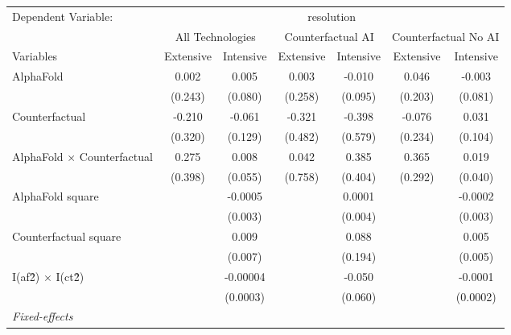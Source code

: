 \begingroup
\centering
\begin{tabular}{lcccccc}
   \tabularnewline \midrule \midrule
   Dependent Variable: & \multicolumn{6}{c}{resolution}\\
 & \multicolumn{2}{c}{All Technologies} & \multicolumn{2}{c}{Counterfactual AI} & \multicolumn{2}{c}{Counterfactual No AI} \\
\cmidrule(lr){1-1}\cmidrule(lr){2-3} \cmidrule(lr){4-5} \cmidrule(lr){6-7}
Variables & \multicolumn{1}{c}{Extensive} & \multicolumn{1}{c}{Intensive} & \multicolumn{1}{c}{Extensive} & \multicolumn{1}{c}{Intensive} & \multicolumn{1}{c}{Extensive} & \multicolumn{1}{c}{Intensive} \\
\cmidrule(lr){1-1}\cmidrule(lr){2-2} \cmidrule(lr){3-3} \cmidrule(lr){4-4} \cmidrule(lr){5-5} \cmidrule(lr){6-6} \cmidrule(lr){7-7}
   AlphaFold                          & 0.002   & 0.005    & 0.003   & -0.010  & 0.046   & -0.003\\   
                                      & (0.243) & (0.080)  & (0.258) & (0.095) & (0.203) & (0.081)\\   
   Counterfactual                     & -0.210  & -0.061   & -0.321  & -0.398  & -0.076  & 0.031\\   
                                      & (0.320) & (0.129)  & (0.482) & (0.579) & (0.234) & (0.104)\\   
   AlphaFold $\times$ Counterfactual  & 0.275   & 0.008    & 0.042   & 0.385   & 0.365   & 0.019\\   
                                      & (0.398) & (0.055)  & (0.758) & (0.404) & (0.292) & (0.040)\\   
   AlphaFold square                   &         & -0.0005  &         & 0.0001  &         & -0.0002\\   
                                      &         & (0.003)  &         & (0.004) &         & (0.003)\\   
   Counterfactual square              &         & 0.009    &         & 0.088   &         & 0.005\\   
                                      &         & (0.007)  &         & (0.194) &         & (0.005)\\   
   I(af\^2) $\times$ I(ct\^2)         &         & -0.00004 &         & -0.050  &         & -0.0001\\   
                                      &         & (0.0003) &         & (0.060) &         & (0.0002)\\   
   \midrule
   \emph{Fixed-effects}\\

\end{tabular}
